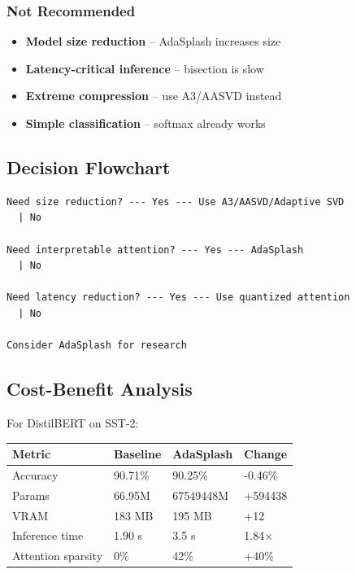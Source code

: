 \subsubsection{Not Recommended}

\begin{itemize}
\item \textbf{Model size reduction} -- AdaSplash increases size
\item \textbf{Latency-critical inference} -- bisection is slow
\item \textbf{Extreme compression} -- use A3/AASVD instead
\item \textbf{Simple classification} -- softmax already works

\end{itemize}
\subsection{Decision Flowchart}

\begin{lstlisting}
Need size reduction? --- Yes --- Use A3/AASVD/Adaptive SVD
  | No
   
Need interpretable attention? --- Yes --- AdaSplash
  | No
   
Need latency reduction? --- Yes --- Use quantized attention
  | No
   
Consider AdaSplash for research
\end{lstlisting}

\subsection{Cost-Benefit Analysis}

For DistilBERT on SST-2:

\begin{table}[H]
\centering
\small
\begin{tabular}{llll}
\toprule
\textbf{Metric} & \textbf{Baseline} & \textbf{AdaSplash} & \textbf{Change} \\
\midrule
Accuracy & 90.71\% & 90.25\% & -0.46\% \\
Params & 66.95M & 67549448M & +594438 \\
VRAM & 183 MB & 195 MB & +12 \\
Inference time & 1.90 s & 3.5 s & 1.84$\times$ \\
Attention sparsity & 0\% & 42\% & +40\% \\
\bottomrule
\end{tabular}
\end{table}

